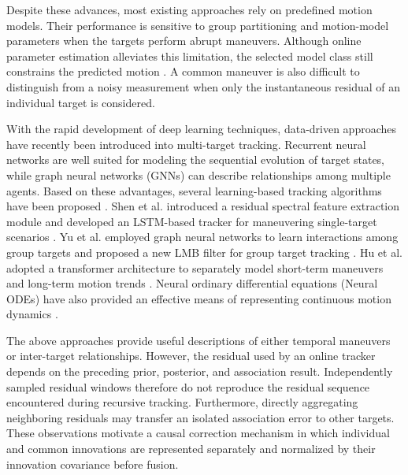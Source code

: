 \documentclass[10pt,doublecolumn]{IEEEtaes}
\begin{document}
Despite these advances, most existing approaches rely on predefined motion models. Their performance is sensitive to group partitioning and motion-model parameters when the targets perform abrupt maneuvers. Although online parameter estimation alleviates this limitation, the selected model class still constrains the predicted motion \cite{shen2026joint}. A common maneuver is also difficult to distinguish from a noisy measurement when only the instantaneous residual of an individual target is considered.

With the rapid development of deep learning techniques, data-driven approaches have recently been introduced into multi-target tracking. Recurrent neural networks are well suited for modeling the sequential evolution of target states, while graph neural networks (GNNs) can describe relationships among multiple agents. Based on these advantages, several learning-based tracking algorithms have been proposed \cite{zhang2024deep}. Shen et al. introduced a residual spectral feature extraction module and developed an LSTM-based tracker for maneuvering single-target scenarios \cite{shen2024mcst}. Yu et al. employed graph neural networks to learn interactions among group targets and proposed a new LMB filter for group target tracking \cite{yu2024enhancing}. Hu et al. adopted a transformer architecture to separately model short-term maneuvers and long-term motion trends \cite{hu2025mff}. Neural ordinary differential equations (Neural ODEs) have also provided an effective means of representing continuous motion dynamics \cite{chen2018neural}.

The above approaches provide useful descriptions of either temporal maneuvers or inter-target relationships. However, the residual used by an online tracker depends on the preceding prior, posterior, and association result. Independently sampled residual windows therefore do not reproduce the residual sequence encountered during recursive tracking. Furthermore, directly aggregating neighboring residuals may transfer an isolated association error to other targets. These observations motivate a causal correction mechanism in which individual and common innovations are represented separately and normalized by their innovation covariance before fusion.
\end{document}
